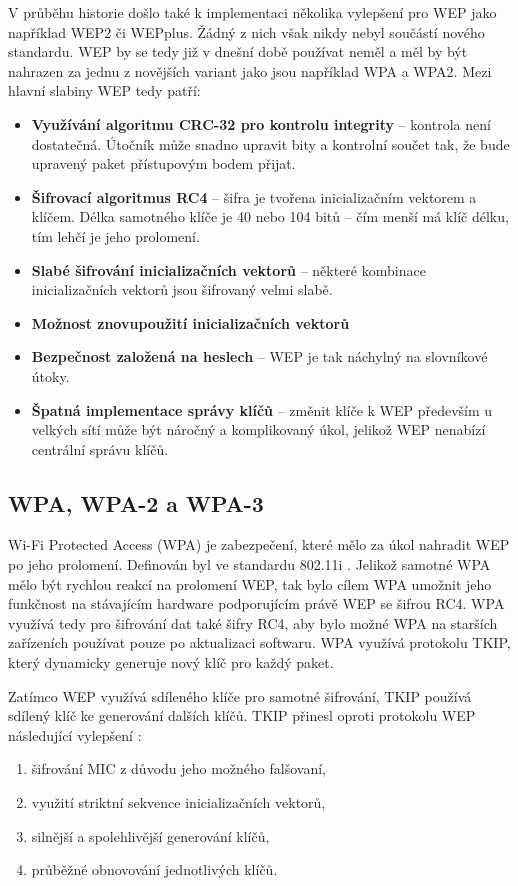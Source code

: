 V průběhu historie došlo také k implementaci několika vylepšení pro WEP jako například WEP2 či WEPplus. Žádný z nich však nikdy nebyl součástí nového standardu. WEP by se tedy již v dnešní době používat neměl a měl by být nahrazen za jednu z novějších variant jako jsou například WPA a WPA2. Mezi hlavní slabiny WEP tedy patří:
\begin{itemize}
  \item{\textbf{Využívání algoritmu CRC-32 pro kontrolu integrity} -- kontrola není dostatečná. Útočník může snadno upravit bity a kontrolní součet tak, že bude upravený paket přístupovým bodem přijat.}
  \item{\textbf{Šifrovací algoritmus RC4} -- šifra je tvořena inicializačním vektorem a klíčem. Délka samotného klíče je 40 nebo 104 bitů -- čím menší má klíč délku, tím lehčí je jeho prolomení.}
  \item{\textbf{Slabé šifrování inicializačních vektorů} -- některé kombinace inicializačních vektorů jsou šifrovaný velmi slabě.}
  \item{\textbf{Možnost znovupoužití inicializačních vektorů}}
  \item{\textbf{Bezpečnost založená na heslech} -- WEP je tak náchylný na slovníkové útoky.}
  \item{\textbf{Špatná implementace správy klíčů} -- změnit klíče k WEP především u velkých sítí může být náročný a komplikovaný úkol, jelikož WEP nenabízí centrální správu klíčů.}
\end{itemize}

\subsection{WPA, WPA-2 a WPA-3}
Wi-Fi Protected Access (WPA) je zabezpečení, které mělo za úkol nahradit WEP po jeho prolomení. Definován byl ve standardu 802.11i \cite{IEEE2005}. Jelikož samotné WPA mělo být rychlou reakcí na prolomení WEP, tak bylo cílem WPA umožnit jeho funkčnost na stávajícím hardware podporujícím právě WEP se šifrou RC4. WPA využívá tedy pro šifrování dat také šifry RC4, aby bylo možné WPA na starších zařízeních používat pouze po aktualizaci softwaru. WPA využívá protokolu TKIP, který dynamicky generuje nový klíč pro každý paket. 

Zatímco WEP využívá sdíleného klíče pro samotné šifrování, TKIP používá sdílený klíč ke generování dalších klíčů. TKIP přinesl oproti protokolu WEP následující vylepšení \cite{adnan2015comparative}:
\begin{enumerate}
  \item{šifrování MIC z důvodu jeho možného falšovaní,}
  \item{využití striktní sekvence inicializačních vektorů,}
  \item{silnější a spolehlivější generování klíčů,}
  \item{průběžné obnovování jednotlivých klíčů.}
\end{enumerate}

